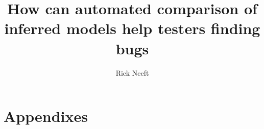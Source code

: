\documentclass{ou-report-vaf}
\author{Rick Neeft}
\title{How can automated comparison of inferred models help testers finding bugs}
\begin{document}
    
    
    \tableofcontents
    \newpage
    
    \printnoidxglossary[type=\acronymtype]
    \newpage
    
    
    \newpage
    
    
    \newpage
    
    
    \newpage
    
    
    \newpage
    
    
    \newpage
    
    \appendix
    \chapter{Appendixes}
    
    \newpage

    
    
\end{document}
